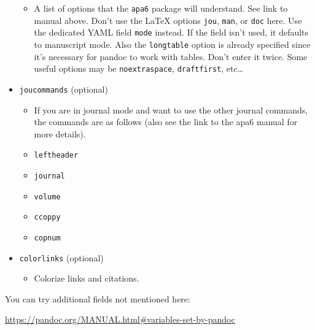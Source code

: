 \documentclass[,longtable]{apa6}
\let\tightlist\relax %
\begin{document}
\begin{itemize}
  \begin{itemize}
  \tightlist
  \item
    A list of options that the \texttt{apa6} package will understand.
    See link to manual above. Don't use the LaTeX options \texttt{jou},
    \texttt{man}, or \texttt{doc} here. Use the dedicated YAML field
    \texttt{mode} instead. If the field isn't used, it defaults to
    manuscript mode. Also the \texttt{longtable} option is already
    specified since it's necessary for pandoc to work with tables. Don't
    enter it twice. Some useful options may be \texttt{noextraspace},
    \texttt{draftfirst}, etc\ldots{}
  \end{itemize}
\item
  \texttt{joucommands} (optional)

  \begin{itemize}
  \tightlist
  \item
    If you are in journal mode and want to use the other journal
    commands, the commands are as follows (also see the link to the apa6
    manual for more details).
  \item
    \texttt{leftheader}
  \item
    \texttt{journal}
  \item
    \texttt{volume}
  \item
    \texttt{ccoppy}
  \item
    \texttt{copnum}
  \end{itemize}
\item
  \texttt{colorlinks} (optional)

  \begin{itemize}
  \tightlist
  \item
    Colorize links and citations.
  \end{itemize}
\end{itemize}

You can try additional fields not mentioned here:

\url{https://pandoc.org/MANUAL.html\#variables-set-by-pandoc}
\end{document}
